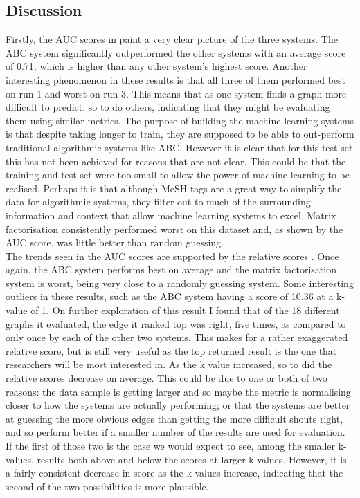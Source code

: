\documentclass{l4proj}
\begin{document}
\subsection{Discussion}

Firstly, the AUC scores in  paint a very clear picture of the three systems. The ABC system significantly outperformed the other systems with an average score of 0.71, which is higher than any other system's highest score. Another interesting phenomenon in these results is that all three of them performed best on run 1 and worst on run 3. This means that as one system finds a graph more difficult to predict, so to do others, indicating that they might be evaluating them using similar metrics. The purpose of building the machine learning systems is that despite taking longer to train, they are supposed to be able to out-perform traditional algorithmic systems like ABC. However it is clear that for this test set this has not been achieved for reasons that are not clear. This could be that the training and test set were too small to allow the power of machine-learning to be realised. Perhaps it is that although MeSH tags are a great way to simplify the data for algorithmic systems, they filter out to much of the surrounding information and context that allow machine learning systems to excel. Matrix factorisation  consistently performed worst on this dataset and, as shown by the AUC score, was little better than random guessing. \\

The trends seen in the AUC scores are supported by the relative scores . Once again, the ABC system performs best on average and the matrix factorisation system is worst, being very close to a randomly guessing system. Some interesting outliers in these results, such as the ABC system having a score of 10.36 at a k-value of 1. On further exploration of this result I found that of the 18 different graphs it evaluated, the edge it ranked top was right, five times, as compared to only once by each of the other two systems. This makes for a rather exaggerated relative score, but is still very useful as the top returned result is the one that researchers will be most interested in. As the k value increased, so to did the relative scores decrease on average. This could be due to one or both of two reasons: the data sample is getting larger and so maybe the metric is normalising closer to how the systems are actually performing; or that the systems are better at guessing the more obvious edges than getting the more difficult shouts right, and so perform better if a smaller number of the results are used for evaluation. If the first of those two is the case we would expect to see, among the smaller k-values, results both above and below the scores at larger k-values. However, it is a fairly consistent decrease in score as the k-values increase, indicating that the second of the two possibilities is more plausible. \\
\end{document}
